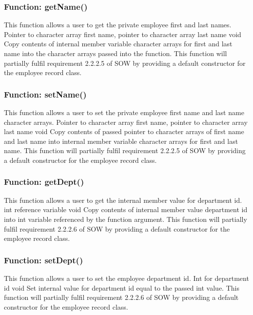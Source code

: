 \documentclass[12pt]{article}%
\newcounter{subsubsubsection}[subsubsection]
\begin{document}
\subsubsection{Function:  getName()}
This function allows a user to get the private employee first and last names.
Pointer to character array first name, pointer to character array last name
void
Copy contents of internal member variable character arrays for first and last name into the
character arrays passed into the function.
This function will partially fulfil requirement 2.2.2.5 of SOW by providing a default constructor for the
employee record class.


\subsubsection{Function:  setName()}
This function allows a user to set the private employee first name and last name character arrays.
Pointer to character array first name, pointer to character array last name
void
Copy contents of passed pointer to character arrays of first name and last name into internal member variable character arrays for first and last name.
This function will partially fulfil requirement 2.2.2.5 of SOW by providing a default constructor for the
employee record class.

\subsubsection{Function:  getDept()}
This function allows a user to get the internal member value for department id.
int reference variable
void
Copy contents of internal member value department id into int variable referenced by the function argument.
This function will partially fulfil requirement 2.2.2.6 of SOW by providing a default constructor for the
employee record class.

\subsubsection{Function:  setDept()}
This function allows a user to set the employee department id.
Int for department id
void
Set internal value for department id equal to the passed int value.
This function will partially fulfil requirement 2.2.2.6 of SOW by providing a default constructor for the
employee record class.
\end{document}
